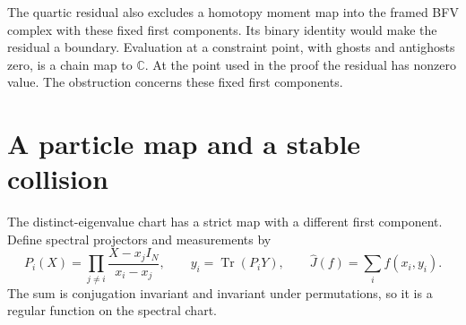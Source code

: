 The quartic residual also excludes a homotopy moment map into
the framed BFV complex with these fixed first components.
Its binary identity would make the residual a boundary.
Evaluation at a constraint point, with ghosts and antighosts
zero, is a chain map to $\mathbb C$. At the point used in the
proof the residual has nonzero value. The obstruction concerns
these fixed first components.

\section{A particle map and a stable collision}

The distinct-eigenvalue chart has a strict map with a different
first component. Define spectral projectors and measurements by
\[
 P_i(X)=\prod_{j\ne i}\frac{X-x_jI_N}{x_i-x_j},
 \qquad y_i=\operatorname{Tr}(P_iY),\qquad
 \widehat J(f)=\sum_i f(x_i,y_i).
\]
The sum is conjugation invariant and invariant under permutations,
so it is a regular function on the spectral chart.

